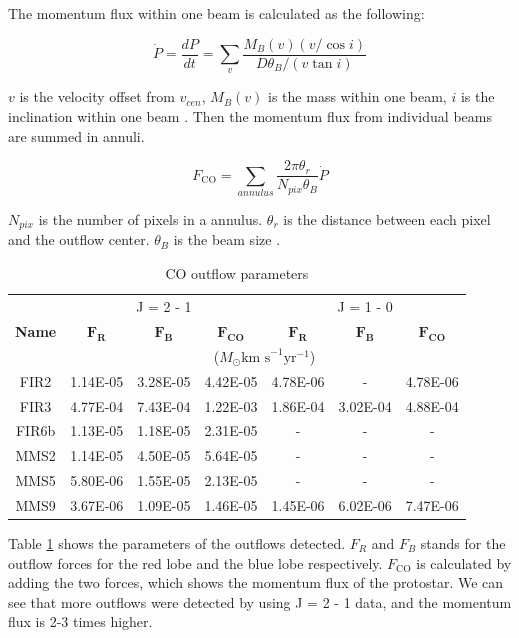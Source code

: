 \documentclass[twoside,11pt]{gshs_thesis}
\begin{document}
The momentum flux within one beam is calculated as the following:

\begin{equation}
\dot{P} = \frac{dP}{dt} = \sum_{v} {\frac{M_B (v) (v/ \cos i)}{D\theta_B / (v \tan i)}}
\end{equation}

$v$ is the velocity offset from $v_{cen}$, $M_B (v)$ is the mass within one beam, $i$ is the inclination within one beam \cite{Hatchell2}.
Then the momentum flux from individual beams are summed in annuli. 

\begin{equation}
F_{\textrm{CO}} = \sum _{annulus} \frac{2\pi \theta_r}{N_{pix}\theta_B}\dot{P}	
\end{equation}

$N_{pix}$ is the number of pixels in a annulus. $\theta_r$ is the distance between each pixel and the outflow center. $\theta_B$ is the beam size \cite{Hatchell2, Marel}.


\begin{table}[h]
	\begin{center}
		\begin{tabular}{c|c|c|c||c|c|c}
			\toprule
			\multirow{3}{1cm}{\textbf{Name}} & \multicolumn{3}{c}{J = 2 - 1} & \multicolumn{3}{c}{J = 1 - 0} \\
			& $\mathbf{F_{R}}$ & $\mathbf{F_{B}}$ & $\mathbf{F_{\textrm{CO}}}$ & $\mathbf{F_{R}}$ & $\mathbf{F_{B}}$ & $\mathbf{F_{\textrm{CO}}}$\\
			& \multicolumn{6}{c}{($M_{\odot} \textrm{km s}^{-1} \textrm{yr}^{-1}$)}\\
			\midrule
			FIR2 & 1.14E-05 & 3.28E-05 & 4.42E-05 & 4.78E-06 & - & 4.78E-06\\
			FIR3 & 4.77E-04 & 7.43E-04 & 1.22E-03 & 1.86E-04 & 3.02E-04 & 4.88E-04\\
			FIR6b & 1.13E-05 & 1.18E-05 & 2.31E-05 & - & - & -\\
			MMS2 & 1.14E-05 & 4.50E-05 & 5.64E-05 & - & - & -\\
			MMS5 & 5.80E-06 & 1.55E-05 & 2.13E-05 & - & - & -\\
			MMS9 & 3.67E-06 & 1.09E-05 & 1.46E-05 & 1.45E-06 & 6.02E-06 & 7.47E-06\\
		\end{tabular}
	\end{center}
	\caption{CO outflow parameters} \label{result}
\end{table}


Table \noindent\ref{result} shows the parameters of the outflows detected. $F_R$ and $F_B$ stands for the outflow forces for the red lobe and the blue lobe respectively. $F_{\textrm{CO}}$ is calculated by adding the two forces, which shows the momentum flux of the protostar. We can see that more outflows were detected by using J = 2 - 1 data, and the momentum flux is 2-3 times higher.\\
\end{document}
